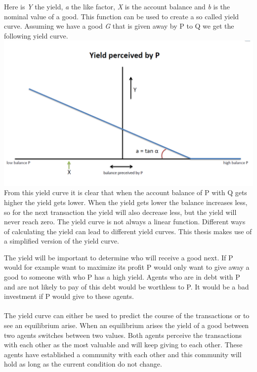 \documentclass[twoside,openright]{uva-bachelor-thesis}
\begin{document}
Here is \textit{Y} the yield, \textit{a} the like factor, \textit{X} is the account balance and \textit{b} is the nominal value of a good. This function can be used to create a so called yield curve. Assuming we have a good \textit{G} that is given away by P to Q we get the following yield curve.
\\
\includegraphics[scale=0.4]{YieldCurves/yieldcurve_P}
\\
From this yield curve it is clear that when the account balance of P with Q gets higher the yield gets lower.  When the yield gets lower the balance increases less, so for the next transaction the yield will also decrease less, but the yield will never reach zero.
The yield curve is not always a linear function. Different ways of calculating the yield can lead to different yield curves. This thesis makes use of a simplified version of the yield curve.

The yield will be important to determine who will receive a good next. If P would for example want to maximize its profit P would only want to give away a good to someone with who P has a high yield. Agents who are in debt with P and are not likely to pay of this debt would be worthless to P. It would be a bad investment if P would give to these agents.
\\
\\
The yield curve can either be used to predict the course of the transactions or to see an equilibrium arise. When an equilibrium arises the yield of a good between two agents switches between two values.  Both agents perceive the transactions with each other as the most valuable and will keep giving to each other. These agents have established a community with each other and this community will hold as long as the current condition do not change. 
\end{document}
